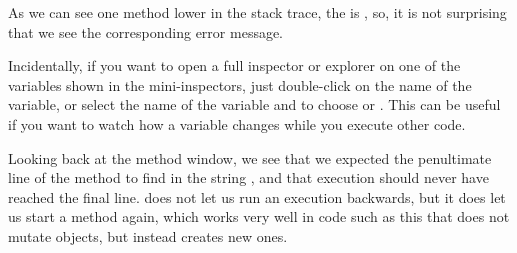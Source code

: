 \documentclass[a4paper,10pt,twoside]{book}
\begin{document}

As we can see one method lower in the stack trace, the  is , so, it is not surprising that we see the corresponding error message.

Incidentally, if you want to open a full inspector or explorer on one of the variables shown in the mini-inspectors, just double-click on the name of the variable, or select the name of the variable and \actclick to choose  or .
This can be useful if you want to watch how a variable changes while you execute other code. 

Looking back at the method window, we see that we expected the penultimate line of the method to find  in the string , and that execution should never have reached the final line.
\pharo does not let us run an execution backwards, but it does let us start a method again, which works very well in code such as this that does not mutate objects, but instead creates new ones.  

\end{document}
